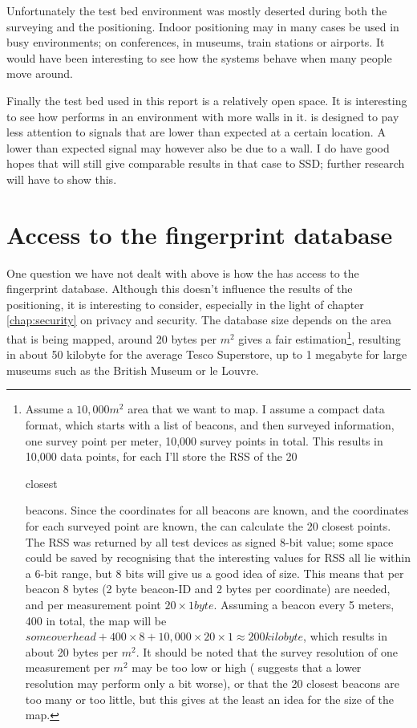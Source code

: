 Unfortunately the test bed environment was mostly deserted during both the surveying and the positioning.
Indoor positioning may in many cases be used in busy environments; on conferences, in museums, train stations or airports.
It would have been interesting to see how the systems behave when many people move around.

Finally the test bed used in this report is a relatively open space.
It is interesting to see how \aBRP performs in an environment with more walls in it.
\aBRP is designed to pay less attention to signals that are lower than expected at a certain location.
A lower than expected signal may however also be due to a wall.
I do have good hopes that \aBRP will still give comparable results in that case to SSD; further research will have to show this.

\section{Access to the fingerprint database}
\label{architecture-database}
One question we have not dealt with above is how the \device has access to the fingerprint database.
Although this doesn't influence the results of the positioning, it is interesting to consider, especially in the light of chapter \ref{chap:security} on privacy and security.
The database size depends on the area that is being mapped, around 20 bytes per $m^2$ gives a fair estimation\footnote{Assume a $10,000m^2$ area that we want to map.
    I assume a compact data format, which starts with a list of beacons, and then surveyed information, one survey point per meter, 10,000 survey points in total.
    This results in 10,000 data points, for each I'll store the RSS of the 20 \begin{em}closest\end{em} beacons.
    Since the coordinates for all beacons are known, and the coordinates for each surveyed point are known, the \device can calculate the 20 closest points.
    The RSS was returned by all test devices as signed 8-bit value; some space could be saved by recognising that the interesting values for RSS all lie within a 6-bit range, but 8 bits will give us a good idea of size.
    This means that per beacon 8 bytes (2 byte beacon-ID and 2 bytes per coordinate) are needed, and per measurement point $20 \times 1 byte$.
    Assuming a beacon every 5 meters, 400 in total, the map will be $some overhead + 400 \times 8 + 10,000 \times 20 \times 1 \approx 200 kilobyte$, which results in about 20 bytes per $m^2$.
    It should be noted that the survey resolution of one measurement per $m^2$ may be too low or high (\citet{bahl2000radar} suggests that a lower resolution may perform only a bit worse), or that the 20 closest beacons are too many or too little, but this gives at the least an idea for the size of the map.
}, resulting in about 50 kilobyte for the average Tesco Superstore, up to 1 megabyte for large museums such as the British Museum or le Louvre.

